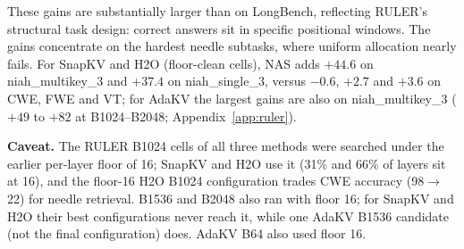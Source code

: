 \documentclass[11pt]{article}
\begin{document}
These gains are substantially larger than on LongBench, reflecting RULER's structural task design: correct answers sit in specific positional windows. The gains concentrate on the hardest needle subtasks, where uniform allocation nearly fails. For SnapKV and H2O (floor-clean cells), NAS adds $+44.6$ on niah\_multikey\_3 and $+37.4$ on niah\_single\_3, versus $-0.6$, $+2.7$ and $+3.6$ on CWE, FWE and VT; for AdaKV the largest gains are also on niah\_multikey\_3 ($+49$ to $+82$ at B1024--B2048; Appendix~\ref{app:ruler}).

\textbf{Caveat.} The RULER B1024 cells of all three methods were searched under the earlier per-layer floor of 16; SnapKV and H2O use it (31\% and 66\% of layers sit at 16), and the floor-16 H2O B1024 configuration trades CWE accuracy (98$\rightarrow$22) for needle retrieval. B1536 and B2048 also ran with floor 16; for SnapKV and H2O their best configurations never reach it, while one AdaKV B1536 candidate (not the final configuration) does. AdaKV B64 also used floor 16.
\end{document}
